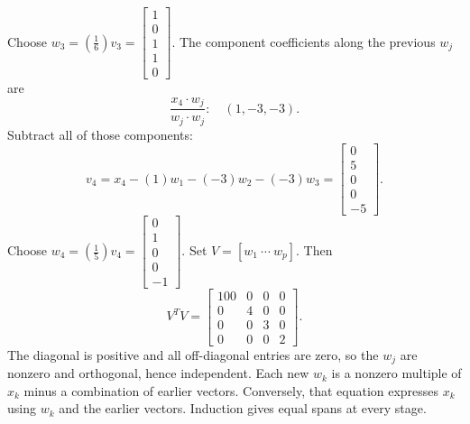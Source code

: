 Choose $w_{3}=(\frac{1}{6})v_{3}=\left[\begin{array}{r}1\\0\\1\\1\\0\end{array}\right]$.
The component coefficients along the previous $w_j$ are
\[\frac{x_{4}\cdot w_j}{w_j\cdot w_j}:\quad(1,-3,-3).\]
Subtract all of those components:
\[v_{4}=x_{4}-(1)w_{1}-(-3)w_{2}-(-3)w_{3}=\left[\begin{array}{r}0\\5\\0\\0\\-5\end{array}\right].\]
Choose $w_{4}=(\frac{1}{5})v_{4}=\left[\begin{array}{r}0\\1\\0\\0\\-1\end{array}\right]$.
Set $V=[w_1\ \cdots\ w_p]$. Then
\[V^TV=\left[\begin{array}{rrrr}100&0&0&0\\0&4&0&0\\0&0&3&0\\0&0&0&2\end{array}\right].\]
The diagonal is positive and all off-diagonal entries are zero, so the $w_j$ are nonzero and orthogonal, hence independent. Each new $w_k$ is a nonzero multiple of $x_k$ minus a combination of earlier vectors. Conversely, that equation expresses $x_k$ using $w_k$ and the earlier vectors. Induction gives equal spans at every stage.

